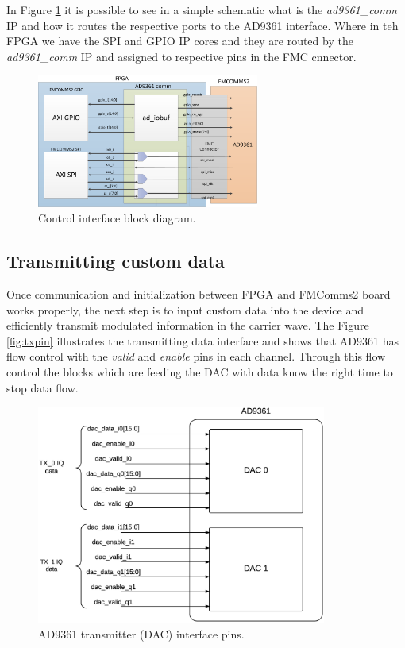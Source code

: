 In Figure \ref{fig:commif} it is possible to see in a simple schematic what is
the \emph{ad9361\_comm} IP and how it routes the respective ports to the AD9361
interface. Where in teh FPGA we have the SPI and GPIO IP cores and they are
routed by the \emph{ad9361\_comm} IP and assigned to respective pins in the FMC
cnnector.

\begin{figure}[htbp]
    \centering
    \includegraphics[width=0.65\textwidth]{./figures/comm_if}
    \caption{ Control interface block diagram.
    \label{fig:commif}}
\end{figure}

\subsection{Transmitting custom data}

Once communication and initialization between FPGA and FMComms2 board works
properly, the next step is to input custom data into the device and efficiently
transmit modulated information in the carrier wave. The Figure \ref{fig:txpin}
illustrates the transmitting data interface and shows that AD9361 has flow
control with the \emph{valid} and \emph{enable} pins in each channel. Through
this flow control the blocks which are feeding the DAC with data know the right
time to stop data flow.

\begin{figure}[htbp]
    \centering
    \includegraphics[width=0.85\textwidth]{./figures/ad9361tx_pins}
    \caption{ AD9361 transmitter (DAC) interface pins.
    \label{fig:txpins}}
\end{figure}

